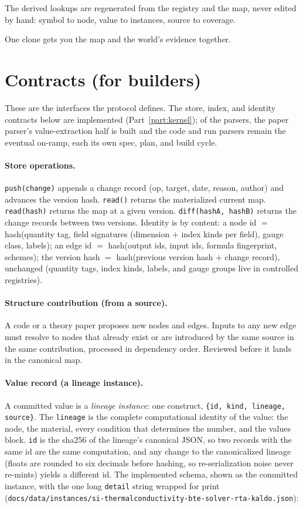 \documentclass[11pt,a4paper]{article}
\begin{document}
The derived lookups are regenerated from the registry and the map, never edited
by hand: symbol to node, value to instances, source to coverage.

One clone gets you the map and the world's evidence together.

\section{Contracts (for builders)}

These are the interfaces the protocol defines. The store, index, and identity
contracts below are implemented (Part~\ref{part:kernel}); of the parsers, the
paper parser's value-extraction half is built and the code and run parsers remain
the eventual on-ramp, each its own spec, plan, and build cycle.

\paragraph{Store operations.} \texttt{push(change)} appends a change record (op, target, date,
reason, author) and advances the version hash. \texttt{read()} returns the
materialized current map. \texttt{read(hash)} returns the map at a given version.
\texttt{diff(hashA, hashB)} returns the change records between two versions. Identity
is by content: a node id $=$ hash(quantity tag, field signatures (dimension $+$
index kinds per field), gauge class, labels); an edge id $=$ hash(output ids,
input ids, formula fingerprint, schemes); the version hash $=$ hash(previous
version hash $+$ change record), unchanged (quantity tags, index kinds, labels,
and gauge groups live in controlled registries).

\paragraph{Structure contribution (from a source).} A code or a theory paper proposes
new nodes and edges. Inputs to any new edge must resolve to nodes that already
exist or are introduced by the same source in the same contribution, processed
in dependency order. Reviewed before it lands in the canonical map.

\paragraph{Value record (a lineage instance).} A committed value is a
\emph{lineage instance}: one construct, \texttt{\{id, kind, lineage, source\}}.
The \texttt{lineage} is the complete computational identity of the value: the
node, the material, every condition that determines the number, and the values
block. \texttt{id} is the sha256 of the lineage's canonical JSON, so two
records with the same id are the same computation, and any change to the
canonicalized lineage (floats are rounded to six decimals before hashing, so
re-serialization noise never re-mints) yields a different id. The implemented schema, shown as the committed
instance, with the one long \texttt{detail} string wrapped for print
(\texttt{docs/data/instances/si-thermalconductivity-bte-solver-rta-kaldo.json}):
\end{document}
